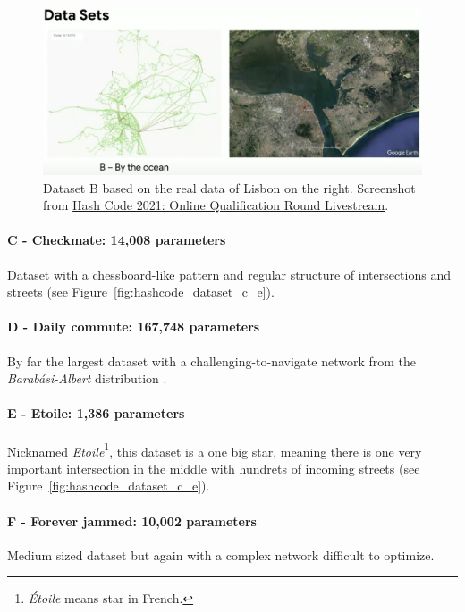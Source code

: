 \begin{figure}[h]
    \centering
    \includegraphics[width=\linewidth]{img/screenshots/hashcode_datasets_b.png}
    \caption[Visualization of dataset B]{
        Dataset B based on the real data of Lisbon on the right. Screenshot from \href{https://www.youtube.com/watch?v=YPOVd-hQUjA}{Hash Code 2021: Online Qualification Round Livestream}.
    }
    \label{fig:hashcode_dataset_b}
\end{figure}

\paragraph{C - Checkmate: 14,008 parameters} Dataset with a chessboard-like pattern and regular structure of intersections and streets (see Figure~\ref{fig:hashcode_dataset_c_e}).

\paragraph{D - Daily commute: 167,748 parameters} By far the largest dataset with a challenging-to-navigate network from the \textit{Barabási-Albert} distribution \cite{albert2002statistical}.

\paragraph{E - Etoile: 1,386 parameters} Nicknamed \textit{Etoile}\footnote{\textit{Étoile} means star in French.}, this dataset is a one big star, meaning there is one very important intersection in the middle with hundrets of incoming streets (see Figure~\ref{fig:hashcode_dataset_c_e}).

\paragraph{F - Forever jammed: 10,002 parameters} Medium sized dataset but again with a complex network difficult to optimize.

